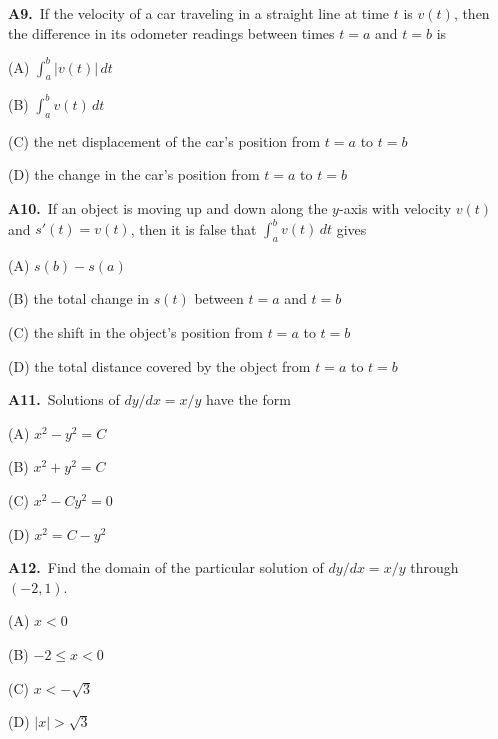 \documentclass[11pt]{article}
\begin{document}
\bigskip\noindent\textbf{A9.}\ If the velocity of a car traveling in a straight line at time $t$ is $v(t)$, then the difference in its odometer readings between times $t=a$ and $t=b$ is
\begin{list}{}{\setlength{\leftmargin}{3em}\setlength{\labelwidth}{2.5em}\setlength{\itemsep}{0pt}\setlength{\topsep}{2pt}}
\item[(A)] $\displaystyle\int_a^b |v(t)|\,dt$
\item[(B)] $\displaystyle\int_a^b v(t)\,dt$
\item[(C)] the net displacement of the car's position from $t=a$ to $t=b$
\item[(D)] the change in the car's position from $t=a$ to $t=b$
\end{list}

\bigskip\noindent\textbf{A10.}\ If an object is moving up and down along the $y$-axis with velocity $v(t)$ and $s'(t)=v(t)$, then it is false that $\displaystyle\int_a^b v(t)\,dt$ gives
\begin{list}{}{\setlength{\leftmargin}{3em}\setlength{\labelwidth}{2.5em}\setlength{\itemsep}{0pt}\setlength{\topsep}{2pt}}
\item[(A)] $s(b)-s(a)$
\item[(B)] the total change in $s(t)$ between $t=a$ and $t=b$
\item[(C)] the shift in the object's position from $t=a$ to $t=b$
\item[(D)] the total distance covered by the object from $t=a$ to $t=b$
\end{list}

\bigskip\noindent\textbf{A11.}\ Solutions of $dy/dx=x/y$ have the form
\begin{list}{}{\setlength{\leftmargin}{3em}\setlength{\labelwidth}{2.5em}\setlength{\itemsep}{0pt}\setlength{\topsep}{2pt}}
\item[(A)] $x^2-y^2=C$
\item[(B)] $x^2+y^2=C$
\item[(C)] $x^2-Cy^2=0$
\item[(D)] $x^2=C-y^2$
\end{list}

\bigskip\noindent\textbf{A12.}\ Find the domain of the particular solution of $dy/dx=x/y$ through $(-2,1)$.
\begin{list}{}{\setlength{\leftmargin}{3em}\setlength{\labelwidth}{2.5em}\setlength{\itemsep}{0pt}\setlength{\topsep}{2pt}}
\item[(A)] $x<0$
\item[(B)] $-2\le x<0$
\item[(C)] $x<-\sqrt3$
\item[(D)] $|x|>\sqrt3$
\end{list}
\end{document}
